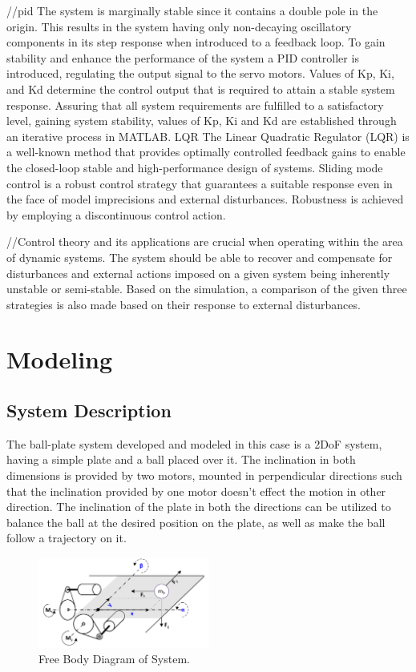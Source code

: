 \documentclass[conference]{IEEEtran}
\begin{document}
//pid The system is marginally stable since it contains a double pole in the origin. This results in the system having only non-decaying oscillatory components in its step response when introduced to a feedback loop. To gain stability and enhance the performance of the system a PID controller is introduced, regulating the output signal to the servo motors. Values of Kp, Ki, and Kd determine the control output that is required to attain a stable system response. Assuring that all system requirements are fulfilled to a satisfactory level, gaining system stability, values of Kp, Ki and Kd are established through an iterative process in MATLAB.
LQR The Linear Quadratic Regulator (LQR) is a well-known method that provides optimally controlled feedback gains to enable the closed-loop stable and high-performance design of systems. Sliding mode control is a robust control strategy that guarantees a suitable response even in the face of model imprecisions and external disturbances. Robustness is achieved by employing a discontinuous control action.

//Control theory and its applications are crucial when operating within the area of dynamic systems. The system should be able to recover and compensate for disturbances and external actions imposed on a given system being inherently unstable or semi-stable. Based on the simulation, a comparison of the given three strategies is also made based on their response to external disturbances. 


\section{Modeling}

\subsection{System Description}

The ball-plate system developed and modeled in this case is a 2DoF system, having a simple plate and a ball placed over it. The inclination in both dimensions is provided by two motors, mounted in perpendicular directions such that the inclination provided by one motor doesn’t effect the motion in other direction. The inclination of the plate in both the directions can be utilized to balance the ball at the desired position on the plate, as well as make the ball follow a trajectory on it.
\begin{figure}[htbp]
\centerline{\includegraphics[width=0.5\textwidth]{FBD.png}}
\caption{Free Body Diagram of System.}
\label{fig1}
\end{figure}
\end{document}
